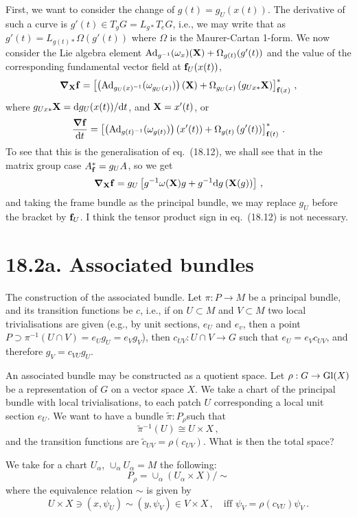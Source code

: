 \documentclass[a4paper,12pt]{article}
\def\d{\mathrm{d}}
\begin{document}
First, we want to consider the change of $g(t) = g_U(x(t))$. The derivative of such a curve is $g'(t)  \in T_g G = L_{g*} T_e G$, i.e., we may write that as $g'(t) = L_{g(t)*}\Omega(g'(t))$ where $\Omega$ is the Maurer-Cartan 1-form. We now consider the Lie algebra element ${\rm Ad}_{g^{-1}}(\omega_x)({\bf X}) + \Omega_{g(t)}(g'(t))$ and the value of the corresponding fundamental vector field at ${\bf f}_U(x(t))$,
\[
 \boldsymbol\nabla_{\bf X}{\bf f}=\left[ \left({\rm Ad}_{g_U(x)^{-1}}(\omega_{g_U(x)})\right)({\bf X}) + \Omega_{g_U(x)}\left( g_{Ux*} {\bf X}\right)\right]_{{\bf f}(x)}^*\,,
\]
where $g_{Ux*}{\bf X} = \d g_U(x(t)) / \d t$, and ${\bf X}=x'(t)$,
or
\[
 \frac{\boldsymbol\nabla\bf f}{\d t} = \left[ \left({\rm Ad}_{g(t)^{-1}}(\omega_{g(t)})\right)(x'(t)) + \Omega_{g(t)}\left( g'(t)\right)\right]_{{\bf f}(t)}^*\,.
\]
To see that this is the generalisation of eq.\ (18.12), we shall see that in the matrix group case $A^*_{\bf f} = g_U A$, so we get
\[
 \boldsymbol\nabla_{\bf X}{\bf f} = g_U\left[ g^{-1}\omega({\bf X}) g + g^{-1}\d g\left({\bf X}(g)\right)\right]\,,
\]
and taking the frame bundle as the principal bundle, we may replace $g_U$ before the bracket by ${\bf f}_U$. I think the tensor product sign in eq.\ (18.12) is not necessary.

\section*{18.2a. Associated bundles}

The construction of the associated bundle. Let $\pi: P\to M$ be a principal bundle, and its transition functions be $c$, i.e., if on $U\subset M$ and $V\subset M$ two local trivialisations are given (e.g., by unit sections, $e_U$ and $e_v$, then a point $P \supset \pi^{-1}(U\cap V) = e_U g_U = e_V g_V$), then $c_{UV}: U\cap V \to G$ such that $e_U = e_V c_{UV}$, and therefore $g_V = c_{VU} g_U$.

An associated bundle may be constructed as a quotient space. Let $\rho: G \to {\rm Gl}(X)$ be a representation of $G$ on a vector space $X$. We take a chart of the principal bundle with local trivialisations, to each patch $U$ corresponding a local unit section $e_U$. We want to have a bundle $ \tilde\pi: P_\rho$such that
\[
 \tilde\pi{}^{-1}(U) \cong U \times X\,,
\]
and the transition functions are $\tilde{c}_{UV} = \rho(c_{UV})$. What is then the total space?

We take for a chart $U_\alpha$, $\cup_\alpha U_\alpha = M$ the following:
\[
 P_\rho = \cup_\alpha (U_\alpha \times X)/\sim
\]
where the equivalence relation $\sim$ is given by
\[
 U\times X \ni (x, \psi_U) \sim (y, \psi_V)\in V\times X\,,\quad\text{iff } \psi_V = \rho(c_{VU})\psi_V\,.
\]
\end{document}
